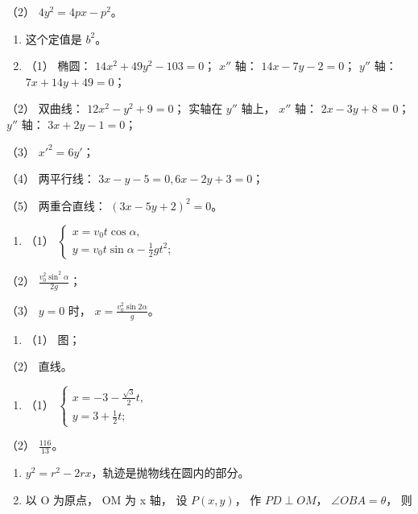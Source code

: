 （2） \(4y^{2} = 4px - p^{2}\)。

\begin{enumerate}
\def\labelenumi{\arabic{enumi}.}
\setcounter{enumi}{35}
\item
  这个定值是 \(b^2\)。
\item
  （1） 椭圆： \(14x^{2} + 49y^{2} - 103 = 0\)； \(x''\) 轴：
  \(14x - 7y - 2 = 0\)； \(y''\) 轴： \(7x + 14y + 49 = 0\)；
\end{enumerate}

（2） 双曲线： \(12x^{2}-y^{2}+9=0\)； 实轴在 \(y''\) 轴上， \(x''\)
轴： \(2x-3y+8=0\)； \(y''\) 轴： \(3x+2y-1=0\)；

（3） \(x'^{2} = 6y'\)；

（4） 两平行线： \(3x - y - 5 = 0, 6x - 2y + 3 = 0\)；

（5） 两重合直线： \((3x - 5y + 2)^{2} = 0\)。

\begin{enumerate}
\def\labelenumi{\arabic{enumi}.}
\setcounter{enumi}{37}
\tightlist
\item
  （1）
  \(\left\{ \begin{array}{l} x = v_0 t \cos \alpha, \\ y = v_0 t \sin \alpha - \frac{1}{2} g t^2; \end{array} \right.\)
\end{enumerate}

（2） \(\frac{v_0^2\sin^2\alpha}{2g}\)；

（3） \(y = 0\) 时， \(x = \frac{v_0^2\sin 2\alpha}{g}\)。

\begin{enumerate}
\def\labelenumi{\arabic{enumi}.}
\setcounter{enumi}{38}
\tightlist
\item
  （1） 图；
\end{enumerate}

（2） 直线。

\begin{enumerate}
\def\labelenumi{\arabic{enumi}.}
\setcounter{enumi}{39}
\tightlist
\item
  （1）
  \(\left\{ \begin{array}{l} x = -3 - \frac{\sqrt{3}}{2} t, \\ y = 3 + \frac{1}{2} t; \end{array} \right.\)
\end{enumerate}

（2） \(\frac{116}{13}\)。

\begin{enumerate}
\def\labelenumi{\arabic{enumi}.}
\setcounter{enumi}{40}
\item
  \(y^{2} = r^{2} - 2rx\)，轨迹是抛物线在圆内的部分。
\item
  以 O 为原点， OM 为 x 轴， 设 \(P(x, y)\)， 作 \(PD \perp OM\)，
  \(\angle OBA = \theta\)， 则
\end{enumerate}

